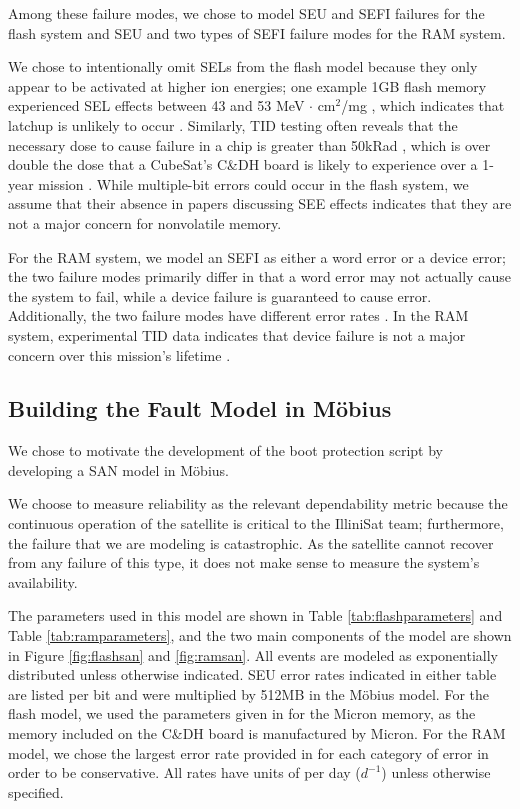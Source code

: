 Among these failure modes, we chose to model SEU and SEFI failures for the flash system and SEU and two types of SEFI failure modes for the RAM system.  

We chose to intentionally omit SELs from the flash model because they only appear to be activated at higher ion energies; one example 1GB flash memory experienced SEL effects between 43 and 53 MeV $\cdot$ cm$^2$/mg \cite{Langley2004SEE}, which indicates that latchup is unlikely to occur \cite{Schwank2013Radiation}.  Similarly, TID testing often reveals that the necessary dose to cause failure in a chip is greater than 50kRad \cite{Oldham2008TID}, which is over double the dose that a CubeSat's C\&DH board is likely to experience over a 1-year mission \cite{Likar2010Novel}.  While multiple-bit errors could occur in the flash system, we assume that their absence in papers discussing SEE effects indicates that they are not a major concern for nonvolatile memory.  

For the RAM system, we model an SEFI as either a word error or a device error; the two failure modes primarily differ in that a word error may not actually cause the system to fail, while a device failure is guaranteed to cause error.  Additionally, the two failure modes have different error rates \cite{Gliem2012memory}.  In the RAM system, experimental TID data indicates that device failure is not a major concern over this mission's lifetime \cite{Herrmann2013InSitu}.
 
\subsection{Building the Fault Model in M\"obius}\label{sec:buildingmodel}

We chose to motivate the development of the boot protection script by developing a SAN model in M\"obius.

We choose to measure reliability as the relevant dependability metric because the continuous operation of the satellite is critical to the IlliniSat team; furthermore, the failure that we are modeling is catastrophic.  As the satellite cannot recover from any failure of this type, it does not make sense to measure the system's availability.

The parameters used in this model are shown in Table \ref{tab:flashparameters} and Table \ref{tab:ramparameters}, and the two main components of the model are shown in Figure \ref{fig:flashsan} and \ref{fig:ramsan}.  All events are modeled as exponentially distributed unless otherwise indicated.  SEU error rates indicated in either table are listed per bit and were multiplied by 512MB in the M\"obius model.  For the flash model, we used the parameters given in \cite{Oldham2008TID} for the Micron memory, as the memory included on the C\&DH board is manufactured by Micron.  For the RAM model, we chose the largest error rate provided in \cite{Gliem2012memory} for each category of error in order to be conservative.  All rates have units of per day ($d^{-1}$) unless otherwise specified.


